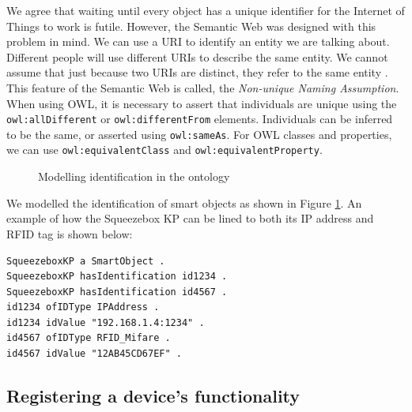 
We agree that waiting until every object has a unique identifier for the Internet of Things to work is futile. However, the Semantic Web was designed with this problem in mind. We can use a \ac{URI} to identify an entity we are talking about. Different people will use different \acp{URI} to describe the same entity. We cannot assume that just because two \acp{URI} are distinct, they refer to the same entity \cite{Allemang2011}. This feature of the Semantic Web is called, the \emph{Non-unique Naming Assumption}. When using \ac{OWL}, it is necessary to assert that individuals are unique using the \texttt{owl:allDifferent} or \texttt{owl:differentFrom} elements. Individuals can be inferred to be the same, or asserted using \texttt{owl:sameAs}. For \ac{OWL} classes and properties, we can use \texttt{owl:equivalentClass} and \texttt{owl:equivalentProperty}.

\begin{figure}[bth]
	\begin{center}
	\end{center}
	\caption{Modelling identification in the ontology}
	\label{identification}
\end{figure}

We modelled the identification of smart objects as shown in Figure \ref{identification}. An example of how the Squeezebox \ac{KP} can be lined to both its IP address and \ac{RFID} tag is shown below:

\begin{verbatim}
SqueezeboxKP a SmartObject .
SqueezeboxKP hasIdentification id1234 .
SqueezeboxKP hasIdentification id4567 .
id1234 ofIDType IPAddress .
id1234 idValue "192.168.1.4:1234" .
id4567 ofIDType RFID_Mifare .
id4567 idValue "12AB45CD67EF" .
\end{verbatim}

\subsection{Registering a device's functionality}

